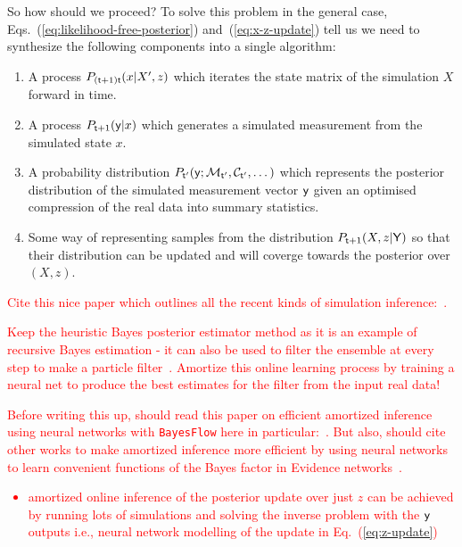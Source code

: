 So how should we proceed? To solve this problem in the general case, Eqs.~(\ref{eq:likelihood-free-posterior}) and~(\ref{eq:x-z-update}) tell us we need to synthesize the following components into a single algorithm:
\begin{enumerate}
\item{A process $P_{({\sf t}+1){\sf t}}(x\vert X', z)$ which iterates the state matrix of the simulation $X$ forward in time.}
\item{A process $P_{{\sf t}+1}({\sf y}\vert x)$ which generates a simulated measurement from the simulated state $x$.}
\item{A probability distribution $P_{{\sf t}'}({\sf y};{\cal M}_{{\sf t}'},{\cal C}_{{\sf t}'}, \dots )$ which represents the posterior distribution of the simulated measurement vector ${\sf y}$ given an optimised compression of the real data into summary statistics.}
\item{Some way of representing samples from the distribution $P_{{\sf t}+1}(X,z\vert {\sf Y})$ so that their distribution can be updated and will coverge towards the posterior over $(X,z)$.}
\end{enumerate}

\textcolor{red}{Cite this nice paper which outlines all the recent kinds of simulation inference:~\cite{cranmer2020frontier}.}

\textcolor{red}{Keep the heuristic Bayes posterior estimator method as it is an example of recursive Bayes estimation - it can also be used to filter the ensemble at every step to make a particle filter~\cite{arulampalam2002tutorial}. Amortize this online learning process by training a neural net to produce the best estimates for the filter from the input real data!}

\textcolor{red}{
Before writing this up, should read this paper on efficient amortized inference using neural networks with \texttt{BayesFlow} here in particular:~\cite{radev2020bayesflow}. But also, should cite other works to make amortized inference more efficient by using neural networks to learn convenient functions of the Bayes factor in Evidence networks~\cite{jeffrey2023evidence}.
\begin{itemize}
\item{amortized online inference of the posterior update over just $z$ can be 
achieved by running lots of simulations and solving the inverse problem with the ${\sf y}$ outputs
i.e., neural network modelling of the update in Eq.~(\ref{eq:z-update})} 
\end{itemize}
}


